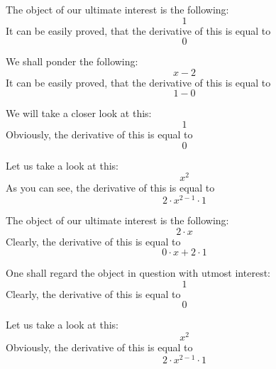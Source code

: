 \documentclass{article}
\begin{document}
The object of our ultimate interest is the following:
\begin{equation}
1 
\end{equation}
It can be easily proved, that the derivative of this is equal to
\begin{equation}
0 
\end{equation}

We shall ponder the following:
\begin{equation}
x - 2 
\end{equation}
It can be easily proved, that the derivative of this is equal to
\begin{equation}
1 - 0 
\end{equation}

We will take a closer look at this:
\begin{equation}
1 
\end{equation}
Obviously, the derivative of this is equal to
\begin{equation}
0 
\end{equation}

Let us take a look at this:
\begin{equation}
x ^{2 } 
\end{equation}
As you can see, the derivative of this is equal to
\begin{equation}
2 \cdot x ^{2 - 1 } \cdot 1 
\end{equation}

The object of our ultimate interest is the following:
\begin{equation}
2 \cdot x 
\end{equation}
Clearly, the derivative of this is equal to
\begin{equation}
0 \cdot x + 2 \cdot 1 
\end{equation}

One shall regard the object in question with utmost interest:
\begin{equation}
1 
\end{equation}
Clearly, the derivative of this is equal to
\begin{equation}
0 
\end{equation}

Let us take a look at this:
\begin{equation}
x ^{2 } 
\end{equation}
Obviously, the derivative of this is equal to
\begin{equation}
2 \cdot x ^{2 - 1 } \cdot 1 
\end{equation}
\end{document}
